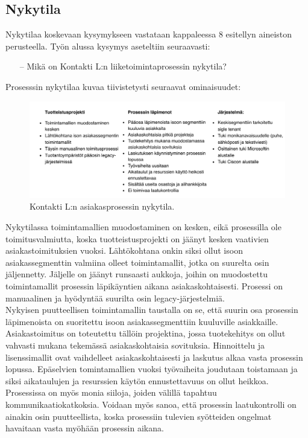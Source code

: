 \documentclass[finnish,12pt,a4paper,pdftex]{article}
\begin{document}
\subsection{Nykytila}
Nykytilaa koskevaan kysymykseen vastataan kappaleessa 8 esitellyn aineiston perusteella. Työn alussa kysymys aseteltiin seuraavasti:
\begin{itemize}
    \item [--] Mikä on Kontakti L:n liiketoimintaprosessin nykytila?
\end{itemize}

\noindent Prosesssin nykytilaa kuvaa tiivistetysti seuraavat ominaisuudet:

\begin{figure}[!h]
    \centering
    \includegraphics[scale=0.8]{images/nykytilaa.pdf}
    \caption{Kontakti L:n asiakasprosessin nykytila.}
    \label{fig:tavoitteet}
\end{figure}

Nykytilassa toimintamallien muodostaminen on kesken, eikä prosessilla ole toimitusvalmiutta, koska tuotteistusprojekti on jäänyt kesken vaativien asiakastoimituksien vuoksi. Lähtökohtana onkin siksi ollut isoon asiakassegmenttin valmiina olleet toimintamallit, jotka on suurelta osin jäljennetty. Jäljelle on jäänyt runsaasti aukkoja, joihin on muodostettu toimintamallit prosessin läpikäyntien aikana asiakaskohtaisesti. Prosessi on manuaalinen ja hyödyntää suurilta osin legacy-järjestelmiä.\\

\noindent Nykyisen puutteellisen toimintamallin taustalla on se, että suurin osa prosessin läpimenoista on suoritettu isoon asiakassegmenttiin kuuluville asiakkaille. Asiakastoimitus on toteutettu tällöin projektina, jossa tuotekehitys on ollut vahvasti mukana tekemässä asiakaskohtaisia sovituksia. Hinnoittelu ja lisenssimallit ovat vaihdelleet asiakaskohtaisesti ja laskutus alkaa vasta prosessin lopussa. Epäselvien tomintamallien vuoksi työvaiheita joudutaan toistamaan ja siksi aikataulujen ja resurssien käytön ennustettavuus on ollut heikkoa. Prosessissa on myös monia siiloja, joiden välillä tapahtuu kommunikaatiokatkoksia. Voidaan myös sanoa, että prosessin laatukontrolli on ainakin osin puutteellista, koska prosessiin tulevien syötteiden ongelmat havaitaan vasta myöhään prosessin aikana.\\
\end{document}
